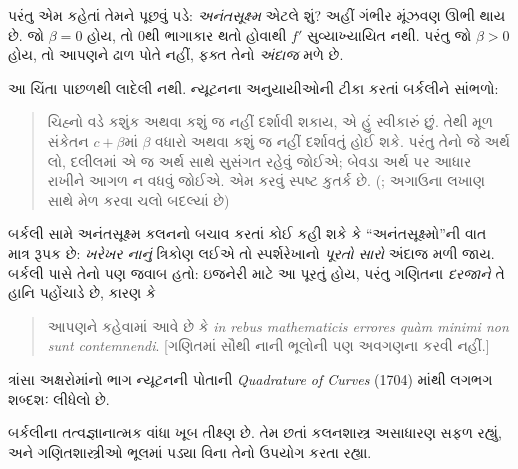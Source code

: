 \documentclass[../../../include/open-logic-section]{subfiles}
\begin{document}
પરંતુ એમ કહેતાં તેમને પૂછવું પડે: \emph{અનંતસૂક્ષ્મ}
એટલે શું? અહીં ગંભીર મૂંઝવણ ઊભી થાય છે.
જો $\beta = 0$ હોય, તો $0$થી ભાગાકાર થતો
હોવાથી $f'$ સુવ્યાખ્યાયિત નથી.
પરંતુ જો $\beta >
0$ હોય, તો આપણને ઢાળ પોતે નહીં,
ફક્ત તેનો \emph{અંદાજ} મળે છે.

આ ચિંતા પાછળથી લાદેલી નથી.
ન્યૂટનના અનુયાયીઓની ટીકા કરતાં બર્કલીને સાંભળો:
\begin{quote}
ચિહ્નો વડે કશુંક અથવા કશું જ નહીં દર્શાવી શકાય,
એ હું સ્વીકારું છું. તેથી મૂળ સંકેતન
$c + \beta$માં $\beta$ વધારો અથવા કશું જ નહીં
દર્શાવતું હોઈ શકે. પરંતુ તેનો જે અર્થ લો,
દલીલમાં એ જ અર્થ સાથે સુસંગત રહેવું જોઈએ;
બેવડા અર્થ પર આધાર રાખીને આગળ ન વધવું જોઈએ.
એમ કરવું સ્પષ્ટ કુતર્ક છે.
(\citealt[\S{}XIII]{Berkeley1734};
અગાઉના લખાણ સાથે મેળ કરવા ચલો બદલ્યાં છે)
\end{quote}
બર્કલી સામે અનંતસૂક્ષ્મ કલનનો બચાવ કરતાં
કોઈ કહી શકે કે “અનંતસૂક્ષ્મો”ની વાત માત્ર
રૂપક છે: \emph{ખરેખર નાનું} ત્રિકોણ લઈએ
તો સ્પર્શરેખાનો \emph{પૂરતો સારો} અંદાજ
મળી જાય. બર્કલી પાસે તેનો પણ જવાબ હતો:
ઇજનેરી માટે આ પૂરતું હોય, પરંતુ ગણિતના
\emph{દરજાને} તે હાનિ પહોંચાડે છે, કારણ કે
\begin{quote}
આપણને કહેવામાં આવે છે કે
\emph{in rebus mathematicis errores qu\`{a}m minimi
non sunt contemnendi}. [ગણિતમાં સૌથી નાની
ભૂલોની પણ અવગણના કરવી નહીં.]
\citep[\S{}IX]{Berkeley1734}
\end{quote}
ત્રાંસા અક્ષરોમાંનો ભાગ ન્યૂટનની પોતાની
\emph{Quadrature of Curves} (1704)
માંથી લગભગ શબ્દશઃ લીધેલો છે.

બર્કલીના તત્વજ્ઞાનાત્મક વાંધા ખૂબ
તીક્ષ્ણ છે. તેમ છતાં કલનશાસ્ત્ર
અસાધારણ સફળ રહ્યું, અને ગણિતશાસ્ત્રીઓ
ભૂલમાં પડ્યા વિના તેનો ઉપયોગ કરતા રહ્યા.
\end{document}
